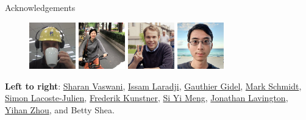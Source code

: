 \documentclass[mathserif,notheorems, hyperref={colorlinks, citecolor=blue, urlcolor=blue, linkcolor=blue}]{beamer}
\begin{document}
\begin{frame}{Acknowledgements}
\begin{figure}
            \vspace{0.4ex}%

            \includegraphics[width=0.18\textwidth]{collaborators/fred}
            \includegraphics[width=0.18\textwidth]{collaborators/cathy}
            \includegraphics[width=0.18\textwidth]{collaborators/wilder}
            \includegraphics[width=0.18\textwidth]{collaborators/joey}
        \end{figure}

        \textbf{Left to right}:
            \href{https://vaswanis.github.io/}{Sharan Vaswani}, \href{https://issamlaradji.github.io/}{Issam Laradji}, \href{https://gauthiergidel.github.io/}{Gauthier Gidel}, \href{https://www.cs.ubc.ca/~schmidtm/}{Mark Schmidt}, \href{http://www.iro.umontreal.ca/~slacoste/}{Simon Lacoste-Julien}, \href{https://fkunstner.github.io/}{Frederik Kunstner}, \href{https://www.cs.ubc.ca/~mengxixi/}{Si Yi Meng}, \href{https://wilderlavington.github.io/}{Jonathan Lavington}, \href{https://joeyandbluewhale.github.io/}{Yihan Zhou}, and Betty Shea. 
    
        \end{frame}
\end{document}
